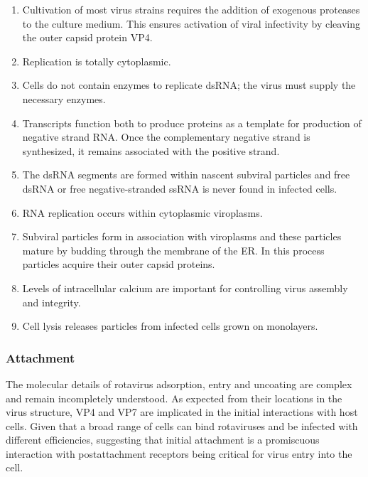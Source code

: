 \begin{enumerate}
	\item Cultivation of most virus strains requires the addition of exogenous proteases to the culture medium. This ensures activation of viral infectivity by cleaving the outer capsid protein VP4.

	\item Replication is totally cytoplasmic.
	
	\item Cells do not contain enzymes to replicate dsRNA; the virus must supply the necessary enzymes.
	
	\item Transcripts function both to produce proteins as a template for production of negative strand RNA. Once the complementary negative strand is synthesized, it remains associated with the positive strand.
	
	\item The dsRNA segments are formed within nascent subviral particles and free dsRNA or free negative-stranded ssRNA is never found in infected cells.
	
	\item RNA replication occurs within cytoplasmic viroplasms.
	
	\item Subviral particles form in association with viroplasms and these particles mature by budding through the membrane of the ER. In this process particles acquire their outer capsid proteins.
	
	\item Levels of intracellular calcium are important for controlling virus assembly and integrity.
	
	\item Cell lysis releases particles from infected cells grown on monolayers.
\end{enumerate}

\subsubsection{Attachment}

The molecular details of rotavirus adsorption, entry and uncoating are complex and remain incompletely understood. As expected from their locations in the virus structure, VP4 and VP7 are implicated in the initial interactions with host cells. Given that a broad range of cells can bind rotaviruses and be infected with different efficiencies, suggesting that initial attachment is a promiscuous interaction with postattachment receptors being critical for virus entry into the cell.

